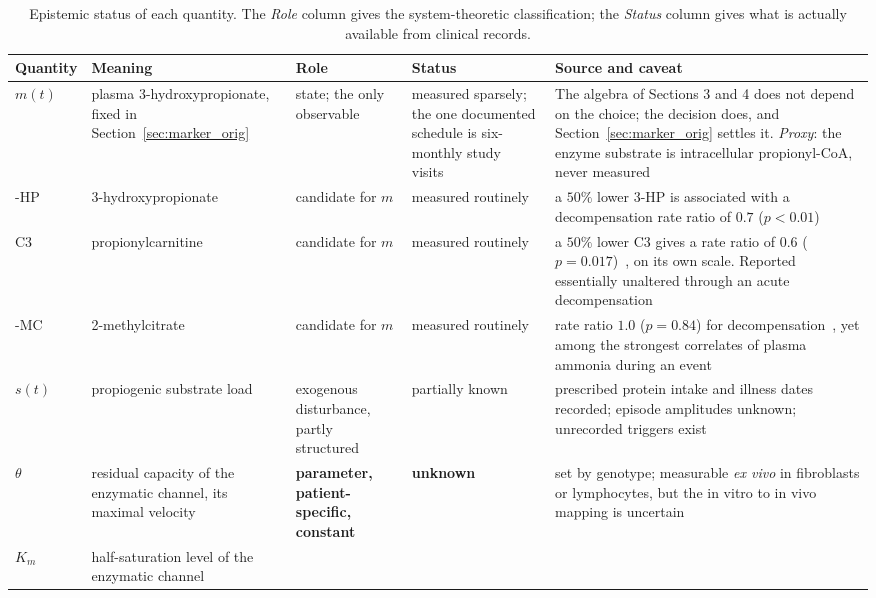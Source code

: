 \begin{table}[htbp]
\centering
\footnotesize
\caption{\label{tab:epistemic}Epistemic status of each quantity. The \emph{Role} column gives the
system-theoretic classification; the \emph{Status} column gives what is actually
available from clinical records.}
\label{tab:status}
\begin{tabular}{@{}p{} p{} p{} p{} p{}@{}}
\toprule
\textbf{Quantity} & \textbf{Meaning} & \textbf{Role} & \textbf{Status} & \textbf{Source and caveat} \\
\midrule
$m(t)$ & plasma 3-hydroxypropionate, fixed in Section~\ref{sec:marker_orig} &
state; the only observable &
measured sparsely; the one documented schedule is six-monthly study
visits~\cite{natural_history} %
&
The algebra of Sections 3 and 4 does not depend on the choice; the decision does, and
Section~\ref{sec:marker_orig} settles it. \emph{Proxy}: the
enzyme substrate is intracellular propionyl-CoA, never measured \\
\addlinespace
3-HP & 3-hydroxypropionate &
candidate for $m$ &
measured routinely &
a $50\%$ lower 3-HP is associated with a decompensation rate ratio of $0.7$
($p<0.01$)~\cite{natural_history} %
\\
\addlinespace
C3 & propionylcarnitine &
candidate for $m$ &
measured routinely &
a $50\%$ lower C3 gives a rate ratio of $0.6$ ($p=0.017$)~\cite{natural_history}, on its
own scale. Reported essentially unaltered through an acute
decompensation~\cite{amd_phenotyping} \\
\addlinespace
2-MC & 2-methylcitrate &
candidate for $m$ &
measured routinely &
rate ratio $1.0$ ($p=0.84$) for decompensation~\cite{natural_history}, yet among the
strongest correlates of plasma ammonia during an
event~\cite{amd_phenotyping} \\
\addlinespace
$s(t)$ & propiogenic substrate load &
exogenous disturbance, partly structured &
partially known &
prescribed protein intake and illness dates recorded; episode amplitudes unknown;
unrecorded triggers exist \\
\addlinespace
$\theta$ & residual capacity of the enzymatic channel, its maximal velocity &
\textbf{parameter, patient-specific, constant} &
\textbf{unknown} &
set by genotype; measurable \emph{ex vivo} in fibroblasts or lymphocytes, but the
in vitro to in vivo mapping is uncertain \\
\addlinespace
$K_m$ & half-saturation level of the enzymatic channel &

\end{tabular}
\end{table}
